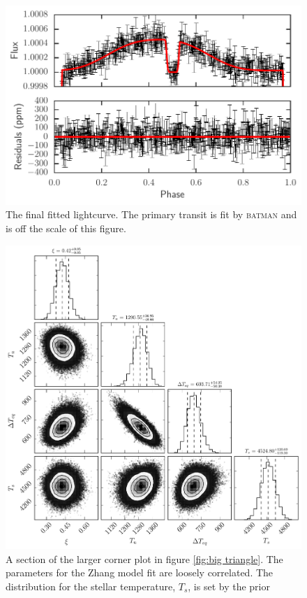 \documentclass[a4paper,fleqn,usenatbib]{mnras}
\begin{document}
\begin{figure}
\begin{center}
\includegraphics[width=\columnwidth]{img/new_lc.pdf}
\caption{The final fitted lightcurve. The primary transit is fit by \textsc{batman} and is off the scale of this figure.}
\label{fig:phase folded}
\end{center}
\end{figure}

\begin{figure}
\begin{center}
\includegraphics[width=\columnwidth]{img/free_parameterstriangle.pdf}
\caption{A section of the larger corner plot in figure \ref{fig:big triangle}. The parameters for the Zhang model fit are loosely correlated. The distribution for the stellar temperature, $T_s$, is set by the prior}
\label{fig:triangle corner sub}
\end{center}
\end{figure}
\end{document}
